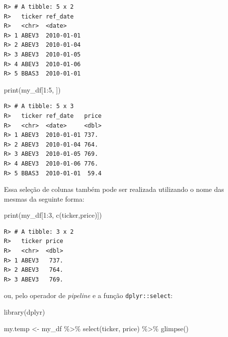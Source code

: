 \documentclass[
  11pt,
]{book}
\newenvironment{Shaded}{\begin{snugshade}}{\end{snugshade}}
\newcommand{\DecValTok}[1]{\textcolor[rgb]{0.06,0.06,0.06}{#1}}
\newcommand{\FunctionTok}[1]{\textcolor[rgb]{0,0,0}{#1}}
\newcommand{\NormalTok}[1]{#1}
\newcommand{\OtherTok}[1]{\textcolor[rgb]{0.37,0.37,0.37}{#1}}
\newcommand{\SpecialCharTok}[1]{\textcolor[rgb]{0,0,0}{#1}}
\newcommand{\StringTok}[1]{\textcolor[rgb]{0.5,0.5,0.5}{#1}}
\begin{document}
\begin{verbatim}
R> # A tibble: 5 x 2
R>   ticker ref_date  
R>   <chr>  <date>    
R> 1 ABEV3  2010-01-01
R> 2 ABEV3  2010-01-04
R> 3 ABEV3  2010-01-05
R> 4 ABEV3  2010-01-06
R> 5 BBAS3  2010-01-01
\end{verbatim}

\begin{Shaded}
\begin{Highlighting}[]
\FunctionTok{print}\NormalTok{(my\_df[}\DecValTok{1}\SpecialCharTok{:}\DecValTok{5}\NormalTok{, ])}
\end{Highlighting}
\end{Shaded}

\begin{verbatim}
R> # A tibble: 5 x 3
R>   ticker ref_date   price
R>   <chr>  <date>     <dbl>
R> 1 ABEV3  2010-01-01 737. 
R> 2 ABEV3  2010-01-04 764. 
R> 3 ABEV3  2010-01-05 769. 
R> 4 ABEV3  2010-01-06 776. 
R> 5 BBAS3  2010-01-01  59.4
\end{verbatim}

Essa seleção de colunas também pode ser realizada utilizando o nome das mesmas da seguinte forma:

\begin{Shaded}
\begin{Highlighting}[]
\FunctionTok{print}\NormalTok{(my\_df[}\DecValTok{1}\SpecialCharTok{:}\DecValTok{3}\NormalTok{, }\FunctionTok{c}\NormalTok{(}\StringTok{\textquotesingle{}ticker\textquotesingle{}}\NormalTok{,}\StringTok{\textquotesingle{}price\textquotesingle{}}\NormalTok{)])}
\end{Highlighting}
\end{Shaded}

\begin{verbatim}
R> # A tibble: 3 x 2
R>   ticker price
R>   <chr>  <dbl>
R> 1 ABEV3   737.
R> 2 ABEV3   764.
R> 3 ABEV3   769.
\end{verbatim}

ou, pelo operador de \emph{pipeline} e a função \texttt{dplyr::select}: 

\begin{Shaded}
\begin{Highlighting}[]
\FunctionTok{library}\NormalTok{(dplyr)}

\NormalTok{my.temp }\OtherTok{\textless{}{-}}\NormalTok{ my\_df }\SpecialCharTok{\%\textgreater{}\%}
  \FunctionTok{select}\NormalTok{(ticker, price) }\SpecialCharTok{\%\textgreater{}\%}
  \FunctionTok{glimpse}\NormalTok{()}
\end{Highlighting}
\end{Shaded}
\end{document}
